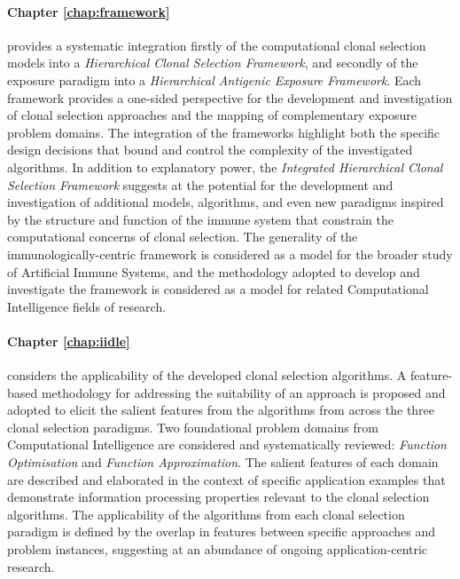 \paragraph{Chapter \ref{chap:framework}} provides a systematic integration firstly of the computational clonal selection models into a \emph{Hierarchical Clonal Selection Framework}, and secondly of the exposure paradigm into a \emph{Hierarchical Antigenic Exposure Framework}. Each framework provides a one-sided perspective for the development and investigation of clonal selection approaches and the mapping of complementary exposure problem domains. The integration of the frameworks highlight both the specific design decisions that bound and control the complexity of the investigated algorithms. In addition to explanatory power, the \emph{Integrated Hierarchical Clonal Selection Framework} suggests at the potential for the development and investigation of additional models, algorithms, and even new paradigms inspired by the structure and function of the immune system that constrain the computational concerns of clonal selection. The generality of the immunologically-centric framework is considered as a model for the broader study of Artificial Immune Systems, and the methodology adopted to develop and investigate the framework is considered as a model for related Computational Intelligence fields of research.

\paragraph{Chapter \ref{chap:iidle}} considers the applicability of the developed clonal selection algorithms. A feature-based methodology for addressing the suitability of an approach is proposed and adopted to elicit the salient features from the algorithms from across the three clonal selection paradigms. Two foundational problem domains from Computational Intelligence are considered and systematically reviewed: \emph{Function Optimisation} and \emph{Function Approximation}. The salient features of each domain are described and elaborated in the context of specific application examples that demonstrate information processing properties relevant to the clonal selection algorithms. The applicability of the algorithms from each clonal selection paradigm is defined by the overlap in features between specific approaches and problem instances, suggesting at an abundance of ongoing application-centric research.


